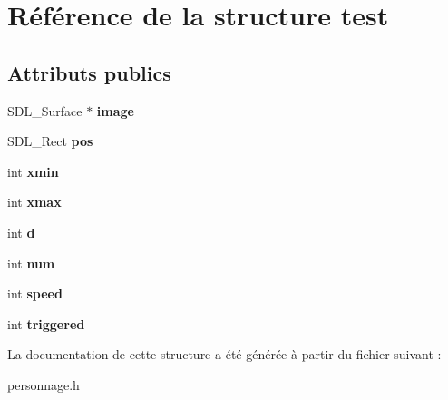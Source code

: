 \hypertarget{structtest}{}\section{Référence de la structure test}
\label{structtest}
\subsection*{Attributs publics}
\begin{DoxyCompactItemize}
\item 
\mbox{\label{structtest_aa611d9a096a2e88565958b93ee42f480}} 
S\+D\+L\+\_\+\+Surface $\ast$ {\bfseries image}
\item 
\mbox{\label{structtest_a02bc6760103ffe3f2f19e3cc85bd2f9a}} 
S\+D\+L\+\_\+\+Rect {\bfseries pos}
\item 
\mbox{\label{structtest_ae2211e607f9dd448c1d6b35675a5bc8e}} 
int {\bfseries xmin}
\item 
\mbox{\label{structtest_a7e81fb134868a8435fefdb916e63edd8}} 
int {\bfseries xmax}
\item 
\mbox{\label{structtest_a19776f2cddb45a7488d22b0fad7d372d}} 
int {\bfseries d}
\item 
\mbox{\label{structtest_a371776b8b06dd040cb3b5fbe612b42f0}} 
int {\bfseries num}
\item 
\mbox{\label{structtest_a79b6aa09681f0d1b1b51e2ec1e6a6f7c}} 
int {\bfseries speed}
\item 
\mbox{\label{structtest_a9160c293a819908aa0cd956bb0221bcc}} 
int {\bfseries triggered}
\end{DoxyCompactItemize}


La documentation de cette structure a été générée à partir du fichier suivant \+:\begin{DoxyCompactItemize}
\item 
personnage.\+h\end{DoxyCompactItemize}
